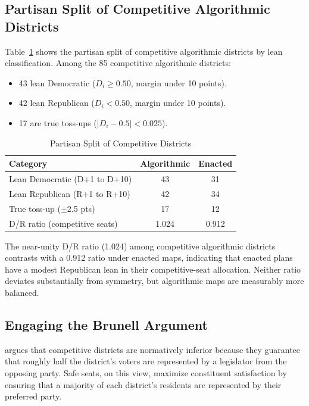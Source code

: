 \label{sec:partisan-asymmetry}

\subsection{Partisan Split of Competitive Algorithmic Districts}

Table~\ref{tab:partisan-split} shows the partisan split of competitive
algorithmic districts by lean classification.  Among the 85 competitive
algorithmic districts:
\begin{itemize}
  \item 43 lean Democratic ($D_i \geq 0.50$, margin under 10 points).
  \item 42 lean Republican ($D_i < 0.50$, margin under 10 points).
  \item 17 are true toss-ups ($|D_i - 0.5| < 0.025$).
\end{itemize}

\begin{table}[h]
\centering
\caption{Partisan Split of Competitive Districts}
\label{tab:partisan-split}
\begin{tabular}{lcc}
\toprule
Category & Algorithmic & Enacted \\
\midrule
Lean Democratic (D+1 to D+10) & 43 & 31 \\
Lean Republican (R+1 to R+10) & 42 & 34 \\
True toss-up ($\pm$2.5 pts) & 17 & 12 \\
\midrule
D/R ratio (competitive seats) & 1.024 & 0.912 \\
\bottomrule
\end{tabular}
\end{table}

The near-unity D/R ratio (1.024) among competitive algorithmic districts
contrasts with a 0.912 ratio under enacted maps, indicating that enacted
plans have a modest Republican lean in their competitive-seat allocation.
Neither ratio deviates substantially from symmetry, but algorithmic maps
are measurably more balanced.

\subsection{Engaging the Brunell Argument}

\citet{brunell2008redistricting} argues that competitive districts are
normatively inferior because they guarantee that roughly half the district's
voters are represented by a legislator from the opposing party.  Safe seats,
on this view, maximize constituent satisfaction by ensuring that a majority
of each district's residents are represented by their preferred party.

